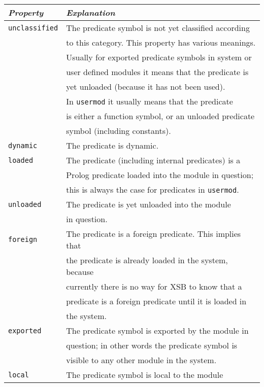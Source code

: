\begin{description}
    \begin{center}
    \begin{tabular}{||l|l||}               \hline 
	{\em Property}		& {\em Explanation} \\ \hline \hline
	{\tt unclassified}	& 
		The predicate symbol is not yet classified according  \\
	&	to this category. This property has various meanings. \\ 
	&	Usually for exported predicate symbols in system or   \\
	&	user defined modules it means that the predicate is   \\
	&	yet unloaded (because it has not been used).	      \\
	&	In {\tt usermod} it usually means that the predicate \\
	&	is either a function symbol, or an unloaded predicate \\
	&	symbol (including constants). \\ \hline
	{\tt dynamic}	& 
		The predicate is dynamic. \\ \hline
	{\tt loaded}		& 
		The predicate (including internal predicates) is a \\ 
	&	Prolog predicate loaded into the module in question; \\
	&	this is always the case for predicates in {\tt usermod}.\\ 
		\hline
	{\tt unloaded}		& 
		The predicate is yet unloaded into the module \\
	&	in question.\\ \hline
	{\tt foreign}	& 
		The predicate is a foreign predicate. This implies that  \\ 
	&	the predicate is already loaded in the system, because	 \\
	&	currently there is no way for XSB  to know that a \\
	&	predicate is a foreign predicate until it is loaded in	 \\
	&	the system.\\ \hline
	\hline
	{\tt exported}	&
		The predicate symbol is exported by the module in \\ 
	&	question; in other words the predicate symbol is \\
	&	visible to any other module in the system. \\ \hline
	{\tt local}	& 
		The predicate symbol is local to the module \\

\end{tabular}
\end{center}
\end{description}
